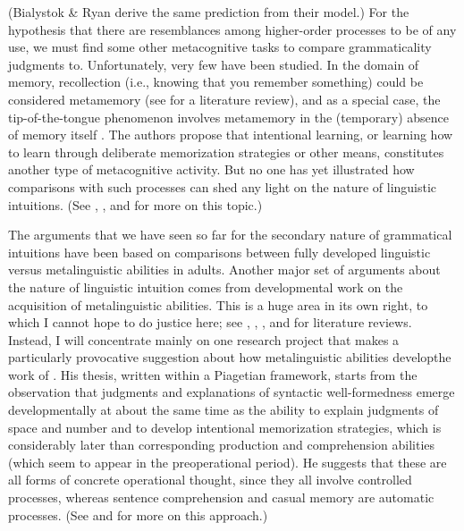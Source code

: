    
\noindent   
(Bialystok \& Ryan derive the same prediction from their model.) For the hypothesis that there are resemblances among higher-order processes to be of any use, we must find some other metacognitive tasks to compare grammaticality judgments to. Unfortunately, very few have been studied. In the domain of memory, recollection (i.e., knowing that you remember something) could be considered metamemory  (see \citealt{RyanEtAl1984} for a literature review),  and as a
special case, the tip-of-the-tongue phenomenon involves metamemory in the (temporary) absence of memory itself \citep{GleitmanEtAl1972}. The authors propose that intentional learning, or learning how to learn through deliberate memorization strategies or other means, constitutes another type of metacognitive activity. But no one has yet illustrated how comparisons with such processes can shed any light on the nature of linguistic intuitions. (See \citealt{VanKleeck1982}, \citealt{Goldman1982}, and \citealt{Gombert1992} for more on this topic.)

The arguments that we have seen so far for the secondary nature of grammatical intuitions have been based on comparisons between fully developed linguistic versus metalinguistic abilities in adults. Another major set of arguments about the nature of linguistic intuition comes from developmental work on the acquisition of metalinguistic abilities. This is a huge area in its own right, to which I cannot hope to do justice here; see \citet{Chaudron1983}, \citet{RyanEtAl1984}, \citet{Birdsong1989}, and \citet{Gombert1992} for literature reviews. Instead, I will concentrate mainly on one research project that makes a particularly provocative suggestion about how metalinguistic abilities develop\schdash{}the work of \citet{Hakes1980}. His thesis, written within a Piagetian framework, starts from the observation that judgments and explanations of syntactic well-formedness emerge developmentally at about the same time as the ability to explain judgments of space and number and to develop intentional memorization strategies, which is considerably later than corresponding production and comprehension abilities (which seem to appear in the preoperational period). He suggests that these are all forms of concrete operational thought, since they all involve controlled processes, whereas sentence comprehension and casual memory are automatic processes. (See  \citealt{VanKleeck1982} and \citealt{RyanEtAl1984} for more on this approach.)

